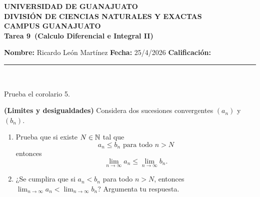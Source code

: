 \documentclass[12pt,a4paper]{article}
\newcommand{\alumno}{Ricardo León Martínez}
\newcommand{\materia}{Calculo Diferencial e Integral II}
\newcommand{\tarea}{Tarea 9}
\newcommand{\fecha}{25/4/2026}
\begin{document}
    \begin{center}
    {\large\textbf{UNIVERSIDAD DE GUANAJUATO}}\\[0.3cm]
    {\normalsize\textbf{DIVISIÓN DE CIENCIAS NATURALES Y EXACTAS}}\\
    {\normalsize\textbf{CAMPUS GUANAJUATO}}\\[1cm]

    {\Large\textbf{\tarea\ (\materia)}}\\[1cm]
    \end{center}

    \textbf{Nombre:} \alumno \hfill 
    \textbf{Fecha:} \fecha \hfill 
    \textbf{Calificación:} \rule{3cm}{0.4pt} \\[0.3cm]

    \begin{mdframed}[style=mdpinkbox,frametitle={Ejercicio 1}]
        Prueba el corolario 5.
    \end{mdframed}

    \begin{mdframed}[style=mdpinkbox,frametitle={Ejercicio 2}]
        \textbf{(Limites y desigualdades)} Considera dos sucesiones convergentes $(a_{n})$  y $(b_{n})$.
        \begin{enumerate}
            \item[(a)] Prueba que si existe $N\in\mathbb{N}$ tal que
            \begin{equation*}
                a_{n}\leq b_{n}\text{ para todo } n\gt N
            \end{equation*}
            entonces
            \begin{equation*}
                \lim_{n\to\infty}a_{n}\leq\lim_{n\to\infty}b_{n}.
            \end{equation*}
            \item[(b)] ¿Se cumplira que si $a_{n}\lt b_{n}$ para todo $n\gt N$, entonces $\lim_{n\to\infty}a_{n}\lt\lim_{n\to\infty}b_{n}$? Argumenta tu respuesta. 
        \end{enumerate}
    \end{mdframed}
\end{document}
